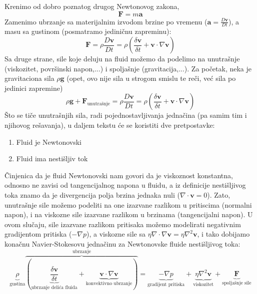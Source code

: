 \documentclass[12pt]{article}
\renewcommand{\vec}[1]{\mathbf{#1}}
\begin{document}
        Krenimo od dobro poznatog drugog Newtonovog zakona,
        \begin{equation}\label{eq:Newtonov 2. zakon}
            \vec{F}=m\vec{a}
        \end{equation}
        Zamenimo ubrzanje sa materijalnim izvodom brzine po vremenu ($\vec{a} = \frac{D\vec{v}}{Dt}$), a masu sa gustinom (posmatramo jedini\v cnu zapreminu):
        \begin{equation}\label{eq:Navier-Stokes izvodjenje 1}
            \vec{F}=\rho\frac{D\vec{v}}{Dt}=\rho(\frac{\delta \vec{v}}{\delta t} + \vec{v} \cdot \nabla \vec{v})
        \end{equation}
        Sa druge strane, sile koje deluju na fluid mo\v zemo da podelimo na unutra\v snje (viskozitet, povr\v sinski napon,...) i spolja\v snje (gravitacija,...). Za po\v cetak, neka je gravitaciona sila $\rho \vec{g}$ (opet, ovo nije sila u strogom smislu te re\v ci, ve\'c sila po jedinici zapremine)
        \begin{equation}\label{eq:Navier-Stokes izvodjenje 2}
            \rho \vec{g} + \vec{F}_{\text{unutra\v snje}}=\rho\frac{D\vec{v}}{Dt}=\rho(\frac{\delta \vec{v}}{\delta t} + \vec{v} \cdot \nabla \vec{v})
        \end{equation}
        \v Sto se ti\v ce unutra\v snjih sila, radi pojednostavljivanja jedna\v cina (pa samim tim i njihovog re\v savanja), u daljem tekstu \'ce se koristiti dve pretpostavke:
        \begin{enumerate}
          \item Fluid je Newtonovski
          \item Fluid ima nesti\v sljiv tok
        \end{enumerate}
        \v Cinjenica da je fluid Newtonovski nam govori da je viskoznost konstantna, odnosno ne zavisi od tangencijalnog napona u fluidu, a iz definicije nesti\v sljivog toka znamo da je divergencija polja brzina jednaka nuli ($\nabla \cdot \vec v = 0$). Zato, unutra\v snje sile mo\v zemo podeliti na one izazvane razlikom u pritiscima (normalni napon), i na viskozne sile izazvane razlikom u brzinama (tangencijalni napon)\cite{particle-fluids}. U ovom slu\v caju, sile izazvane razlikom pritisaka mo\v zemo modelirati negativnim gradijentom pritiska ($-\nabla p$), a viskozne sile sa $\eta\nabla\cdot\nabla\vec{v}=\eta\nabla^2\vec{v}$, i tako dobijamo kona\v cnu Navier-Stokesovu jedna\v cinu za Newtonovske fluide nesti\v sljivog toka:
        \begin{equation}\label{eq:Navier-Stokes za nn fluide}
         \underbrace{\rho}_{\text{gustina}} \overbrace{(\underbrace{\frac{\delta \vec{v}}{\delta t}}_{\text{ubrzanje deli\'ca fluida}} + \underbrace{\vec{v} \cdot \nabla \vec{v}}_{\text{konvektivno ubrzanje}})}^{\text{ubrzanje}} = \underbrace{-\nabla p}_{\text{gradijent pritiska}} + \underbrace{\eta\nabla^2\vec{v}}_{\text{viskozitet}} + \underbrace{\vec{F}}_{\text{spolja\v snje sile}}
        \end{equation}
\end{document}
